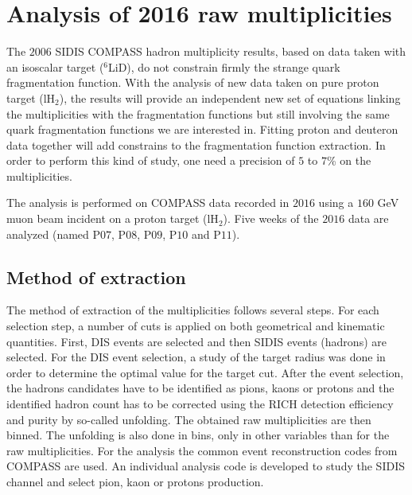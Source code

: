 
\chapter{Analysis of 2016 raw multiplicities} %

\label{ch:raw} %

The $2006$ SIDIS COMPASS hadron multiplicity results, based on data taken with an isoscalar target ($^6$LiD), do not constrain firmly the strange quark fragmentation function.
With the analysis of new data taken on pure proton target (lH$_2$), the results will provide an independent new set of equations linking the multiplicities with the fragmentation functions but still involving the same quark fragmentation functions we are interested in. Fitting proton and deuteron data together will add constrains to the fragmentation function extraction.
In order to perform this kind of study, one need a precision of $5$ to $7$\% on the multiplicities.

The analysis is performed on COMPASS data recorded in $2016$ using a $160$ GeV muon beam incident on a proton target (lH$_2$). Five weeks of the $2016$ data are analyzed (named P$07$, P$08$, P$09$, P$10$ and P$11$).


\section{Method of extraction}

The method of extraction of the multiplicities follows several steps. For each selection step, a number of cuts is applied on both geometrical and kinematic quantities. First, DIS events are selected and then SIDIS events (hadrons) are selected. For the DIS event selection, a study of the target radius was done in order to determine the optimal value for the target cut. After the event selection, the hadrons candidates have to be identified as pions, kaons or protons and the identified hadron count has to be corrected using the RICH detection efficiency and purity by so-called unfolding. The obtained raw multiplicities are then binned. The unfolding is also done in bins, only in other variables than for the raw multiplicities. For the analysis the common event reconstruction codes from COMPASS are used. An individual analysis code is developed to study the SIDIS channel and select pion, kaon or protons production.

